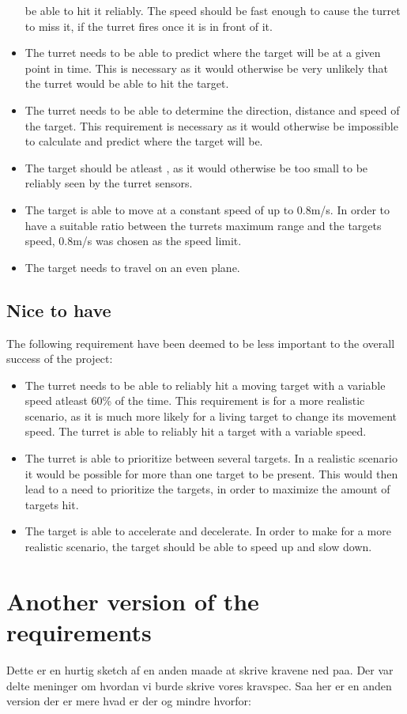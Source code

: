 \begin{itemize}
  be able to hit it reliably. The speed should be fast enough to cause the
  turret to miss it, if the turret fires once it is in front of it.
  \item The turret needs to be able to predict where the target will be at a given point
in time. This is necessary as it would otherwise be very unlikely that the
turret would be able to hit the target.
  \item The turret needs to be able to determine the direction, distance
  and speed of the target. This requirement is necessary as it would otherwise be impossible to
calculate and predict where the target will be.
  \item The target should be atleast , as it
would otherwise be too small to be reliably seen by the turret sensors.
  \item The target is able to move at a constant speed of up to 0.8m/s. In order to
have a suitable ratio between the turrets maximum range and the targets
speed, 0.8m/s was chosen as the speed limit.
  \item The target needs to travel on an even plane.
\end{itemize}

\subsection{Nice to have}
The following requirement have been deemed to be less important to the overall
success of the project:
\begin{itemize}
  \item The turret needs to be able to reliably hit a moving target with a
variable speed atleast 60\% of the time. This requirement is for a
more realistic scenario, as it is much more likely for a living target to
change its movement speed. The turret is able to reliably hit a target with a
variable speed.
  \item The turret is able to prioritize between several targets. In a realistic
scenario it would be possible for more than one target to be present. This would
then lead to a need to prioritize the targets, in order to maximize the
amount of targets hit.
  \item The target is able to accelerate and decelerate. In order to make for a
  more realistic scenario, the target should be able to speed up and slow down.
\end{itemize}

\section{Another version of the requirements}
Dette er en hurtig sketch af en anden maade at skrive kravene ned paa. Der var
delte meninger om hvordan vi burde skrive vores kravspec. Saa her er en
anden version der er mere hvad er der og mindre hvorfor:\nl


